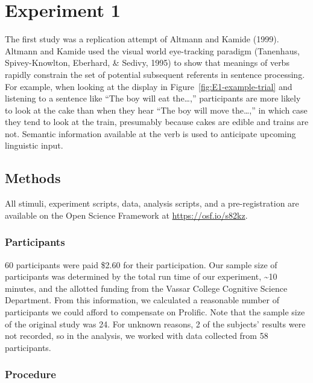 \documentclass[
  man,floatsintext]{apa6}
\begin{document}
\hypertarget{experiment-1}{%
\section{Experiment 1}\label{experiment-1}}

The first study was a replication attempt of
Altmann and Kamide (1999). Altmann and Kamide used the
visual world eye-tracking paradigm (Tanenhaus, Spivey-Knowlton, Eberhard, \& Sedivy, 1995) to show that
meanings of verbs rapidly constrain the set of potential subsequent
referents in sentence processing. For example, when looking at the
display in Figure~\ref{fig:E1-example-trial} and listening to a sentence like
``The boy will eat the\ldots,'' participants are more likely to look at the cake than
when they hear ``The boy will move the\ldots,'' in which case they tend to look at the
train, presumably because cakes are edible and trains are not. Semantic
information available at the verb is used to anticipate upcoming
linguistic input.

\hypertarget{methods}{%
\subsection{Methods}\label{methods}}

All stimuli, experiment scripts, data, analysis scripts, and a
pre-registration are available on the Open Science Framework at
\url{https://osf.io/s82kz}.

\hypertarget{participants-1}{%
\subsubsection{Participants}\label{participants-1}}

60 participants were paid \$2.60 for their participation. Our sample size
of participants was determined by the total run time of our experiment,
\textasciitilde10 minutes, and the allotted funding from the Vassar College Cognitive
Science Department. From this information, we calculated a reasonable
number of participants we could afford to compensate on Prolific. Note
that the sample size of the original study was 24. For unknown reasons,
2 of the subjects' results were not recorded, so in the analysis, we
worked with data collected from 58 participants.

\hypertarget{procedure}{%
\subsubsection{Procedure}\label{procedure}}
\end{document}
